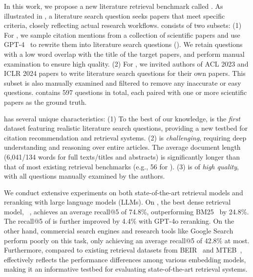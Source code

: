 In this work, we propose a new literature retrieval benchmark called \emph{\ours{}}. As illustrated in , a literature search question seeks papers that meet specific criteria, closely reflecting actual research workflows.
\ours{} consists of two subsets:
(1) For , we sample citation mentions from a collection of scientific papers and use GPT-4~\citep{openai2023gpt4} to rewrite them into literature search questions (). 
We retain questions with a low word overlap with the title of the target papers, and perform manual examination to ensure high quality. 
(2) For , we invited authors of ACL 2023 and ICLR 2024 papers to write literature search questions for their own papers. 
This subset is also manually examined and filtered to remove any inaccurate or easy questions.
\ours{} contains 597 questions in total, each paired with one or more scientific papers as the ground truth. 

\ours{} has several unique characteristics: 
(1) To the best of our knowledge, \ours{} is the \emph{first} dataset featuring realistic literature search questions, providing a new testbed for citation recommendation and retrieval systems.
(2) \ours{} is \emph{challenging}, requiring deep understanding and reasoning over entire articles. The average document length (6,041/134 words for full texts/titles and abstracts) is significantly longer than that of most existing retrieval benchmarks (e.g., 56 for \citep{nguyen2017ms}).
(3) \ours{} is of \emph{high quality}, with all questions manually examined by the authors.

We conduct extensive experiments 
on both state-of-the-art retrieval models and 
reranking with large language models (LLMs). 
On \ours{}, the best dense retrieval model, \grit{}~\citep{muennighoff2024generative}, achieves an average recall@5
of 74.8\%, outperforming BM25~\citep{bm25} by 24.8\%.
The recall@5 of \grit{} is further improved by 4.4\% with GPT-4o reranking.
On the other hand, commercial search engines and research tools like Google Search perform poorly on this task, only achieving an average recall@5 of 42.8\% at most. 
Furthermore, compared to existing retrieval datasets from 
BEIR~\citep{thakur2021beir} and MTEB~\citep{muennighoff2022mteb}, 
\ours{} effectively reflects the performance differences among various embedding models, 
making it an informative testbed for evaluating state-of-the-art retrieval systems.

\section{\ours{}}

